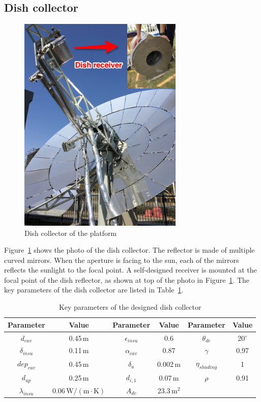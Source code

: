\subsection{Dish collector}

\begin{figure}[!ht]
\centering
\includegraphics[width=0.7\textwidth]{fig/DishCollector.jpg}
\caption{Dish collector of the platform}\label{fig:DishCollector}
\end{figure}
Figure~\ref{fig:DishCollector} shows the photo of the dish collector. The reflector is made of multiple curved mirrors. When the aperture is facing to the sun, each of the mirrors reflects the sunlight to the focal point. 
A self-designed receiver is mounted at the focal point of the dish reflector, as shown at top of the photo in Figure~\ref{fig:DishCollector}.
The key parameters of the dish collector are listed in Table~\ref{tab:ddc}. 
\begin{table}[htbp]
	\caption{Key parameters of the designed dish collector}
	\begin{center}
	\begin{tabular}{cccccc}
		\toprule
		Parameter		&	Value	&	Parameter		&	Value	&	Parameter		&	Value\\
		\midrule
		$d_{cav}$	&	0.45$\,\mathrm{m}$	&	$\epsilon_{insu}$	&	0.6	&	$\theta_{dc}$	&	20$^\circ$\\
		$\delta_{insu}$	&	0.11$\,\mathrm{m}$	&	$\alpha_{cav}$	&	0.87	&	$\gamma$	&	0.97\\
		$dep_{cav}$	&	0.45$\,\mathrm{m}$	&	$\delta_a$		&	0.002$\,\mathrm{m}$	&	$\eta_{shading}$	&	1\\
		$d_{ap}$	&	0.25$\,\mathrm{m}$	&	$d_{i,1}$	&	0.07$\,\mathrm{m}$	&	$\rho$	&	0.91\\
		$\lambda_{insu}$	&	0.06$\,\mathrm{W/(m\cdot K)}$	&	$A_{dc}$	&	23.3$\,\mathrm{m^2}$	&	\\		
		\bottomrule
	\end{tabular}
	\end{center}
	\label{tab:ddc}
\end{table}

